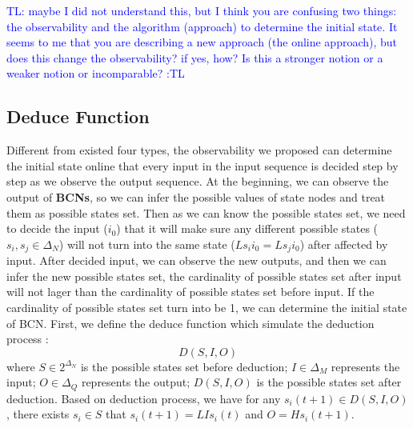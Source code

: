 \documentclass[letterpaper, 10 pt, conference]{ieeeconf}  %
\newcommand{\tl}[1]{\textcolor{blue} {TL: #1 :TL} }
\begin{document}
\tl{maybe I did not understand this, but I think you are confusing two things: the observability and the algorithm (approach) to determine the initial state. It seems to me that you are describing a new approach (the online approach), but does this change the observability? if yes, how? Is this a stronger notion or a weaker notion or incomparable?}
\subsection{Deduce Function}
Different from existed four types, the observability we proposed can determine the initial state online that every input in the input sequence is decided step by step as we observe the output sequence. At the beginning, we can observe the output of {\bf BCNs}, so we can infer the possible values of state nodes and treat them as possible states set. Then as we can know the possible states set, we need to decide the input ($i_0$) that it will make sure any different possible states ($s_i, s_j\in \Delta_N$) will not turn into the same state ($Ls_i i_0=Ls_j i_0$) after affected by input. After decided input, we can observe the new outputs, and then we can infer the new possible states set, the cardinality of possible states set after input will not lager than the cardinality of possible states set before input. If the cardinality of possible states set turn into be 1, we can determine the initial state of BCN. First, we define the deduce function  which simulate the deduction process :
$$D\left(S, I, O\right)$$
where $S\in 2^{\Delta_N}$ is the possible states set before deduction; $I\in\Delta_M$ represents the input; $O\in\Delta_Q$ represents the output; $D\left(S, I, O\right)$ is the possible states set after deduction. Based on deduction process, we have for any $s_i(t+1)\in D\left(S, I, O\right)$, there exists $s_i\in S$ that $s_i(t+1)=LIs_i(t)$ and $O=Hs_i(t+1)$.
\end{document}

